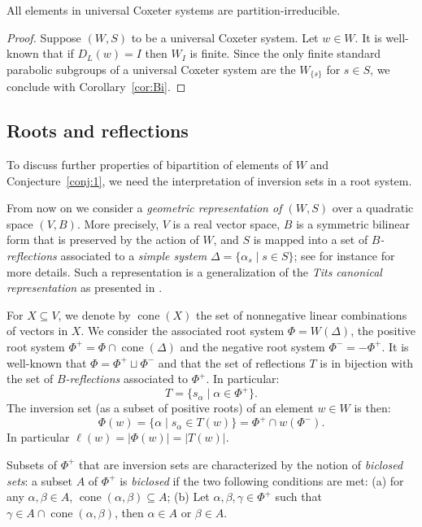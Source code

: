 \documentclass[ALCO,Unicode]{cedram}
\theoremstyle{definition}
\newcommand{\cone}{\operatorname{cone}}
\begin{document}
\begin{prop}\label{prop:Conj1True} All elements in universal Coxeter systems are partition-irreducible. 
\end{prop}
\begin{proof} Suppose $(W,S)$ to be a universal Coxeter system. Let $w\in W$. It is well-known that if $D_L(w)=I$ then $W_I$ is finite. Since the only finite standard parabolic subgroups of a universal Coxeter system are the $W_{\{s\}}$ for $s\in S$, we conclude with Corollary~\ref{cor:Bi}. 
\end{proof}

\subsection{Roots and reflections} To discuss further properties of bipartition of elements of $W$ and Conjecture~\ref{conj:1}, we need the interpretation of inversion sets in a root system.

From now on  we consider a {\em geometric representation of $(W,S)$} over a quadratic space $(V,B)$. More precisely,  $V$ is a real vector space, $B$ is a symmetric bilinear form that is preserved by the action of $W$, and $S$ is mapped into a set of {\em $B$-reflections} associated to a {\em simple system} $\Delta=\{\alpha_s\mid s\in S\}$;  see for instance \cite[\S2.1]{HoLa16} for more details. Such a representation is a generalization of the {\em Tits canonical representation} as presented in \cite[\S4.1]{BjBr05}. 

For $X\subseteq V$, we denote by $\cone(X)$ the set of nonnegative linear combinations of vectors in $X$. We consider the associated root system $\Phi=W(\Delta)$, the positive root system $\Phi^+=\Phi\cap \cone(\Delta)$ and the negative root system $\Phi^-=-\Phi^+$. It is well-known that $\Phi=\Phi^+\sqcup \Phi^-$ and that the set of reflections $T$ is in bijection with the set of {\em $B$-reflections} associated to $\Phi^+$. In particular:
$$
T=\{s_\alpha\mid \alpha\in\Phi^+\}.
$$
The inversion set (as a subset of positive roots) of an element $w\in W$ is then:
$$
\Phi(w)=\{\alpha \mid s_\alpha \in T(w)\}=\Phi^+\cap w(\Phi^-).
$$
In particular $\ell(w)=|\Phi(w)|=|T(w)|$.

Subsets of $\Phi^+$ that are inversion sets are characterized by the notion of {\em biclosed sets}: a subset $A$ of $\Phi^+$ is {\em biclosed} if the two following conditions are met: (a) for any $\alpha,\beta \in A$, $\cone(\alpha,\beta)\subseteq A$; (b) Let $\alpha,\beta,\gamma\in \Phi^+$ such that $\gamma\in A\cap \cone(\alpha,\beta)$, then $\alpha\in A$ or $\beta\in A$. 
\end{document}
